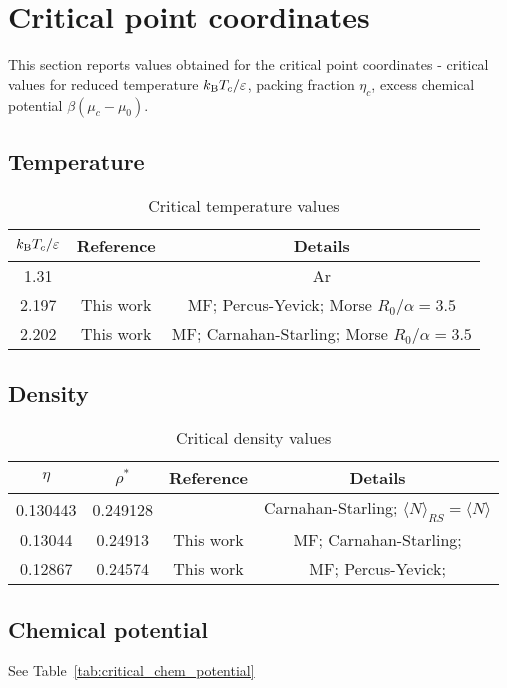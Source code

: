 \section{Critical point coordinates}
This section reports values obtained for the critical point coordinates - critical values for reduced temperature $k_{{\rm B}}T_c / \varepsilon$, packing fraction $\eta_c$, excess chemical potential $\beta(\mu_c - \mu_0)$.

\subsection{Temperature}
\begin{table}[h]
	\caption{Critical temperature values}
	\begin{center}
		\begin{tabular}{|c|c|c|}
			\hline
			$k_{{\rm B}}T_c / \varepsilon$  \quad & Reference \quad & Details \quad \quad \\
			\hline
			1.31  & \cite{YukhJSP1995} & Ar \\
			2.197  & This work & MF; Percus-Yevick; Morse $R_0/\alpha=3.5$ \\
			2.202  & This work & MF; Carnahan-Starling; Morse $R_0/\alpha=3.5$ \\
			\hline
		\end{tabular}
	\end{center}
\end{table}


\subsection{Density}

\begin{table}[h]
	\caption{Critical density values}
	\begin{center}
		\begin{tabular}{|c|c|c|c|}
			\hline
			$\eta$  \quad & $\rho^*$ \quad & Reference \quad & Details \quad \quad \\
			\hline
			0.130443  & 0.249128 & \cite{YukhJSP1995} & Carnahan-Starling; $\langle N \rangle_{RS} = \langle N \rangle$ \\
			0.13044  & 0.24913 & This work & MF; Carnahan-Starling; \\
			0.12867  & 0.24574 & This work & MF; Percus-Yevick; \\
			\hline
		\end{tabular}
	\end{center}
\end{table}

\subsection{Chemical potential}
See Table~\ref{tab:critical_chem_potential}
